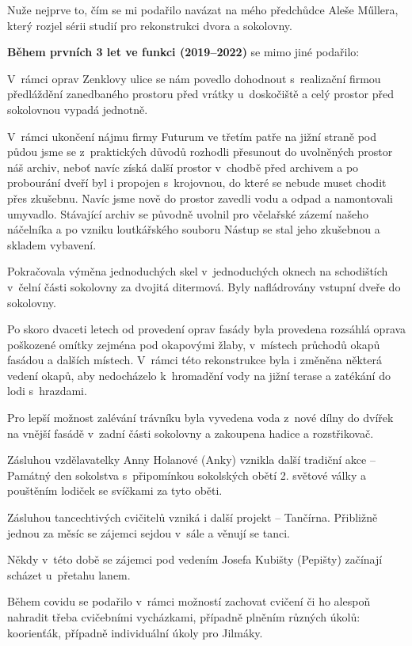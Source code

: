 \documentclass[11pt]{article}
\begin{document}
Nuže nejprve to, čím se mi podařilo navázat na mého předchůdce Aleše Műllera, který rozjel sérii studií pro rekonstrukci dvora a sokolovny. 
 
\textbf{Během prvních 3 let ve funkci (2019–2022)} se mimo jiné podařilo: 

V~rámci oprav Zenklovy ulice se nám povedlo dohodnout s~realizační firmou předláždění zanedbaného prostoru před vrátky u~doskočiště a celý prostor před sokolovnou vypadá jednotně. 

V~rámci ukončení nájmu firmy Futurum ve třetím patře na jižní straně pod půdou jsme se z~praktických důvodů rozhodli přesunout do uvolněných prostor náš archiv, neboť navíc získá další prostor v~chodbě před archivem a po probourání dveří byl i propojen s~krojovnou, do které se nebude muset chodit přes zkušebnu. Navíc jsme nově do prostor zavedli vodu a odpad a namontovali umyvadlo. Stávající archiv se původně uvolnil pro včelařské zázemí našeho náčelníka a po vzniku loutkářského souboru Nástup se stal jeho zkušebnou a skladem vybavení.

Pokračovala výměna jednoduchých skel v~jednoduchých oknech na schodištích v~čelní části sokolovny za dvojitá ditermová. Byly nafládrovány vstupní dveře do sokolovny.

Po skoro dvaceti letech od provedení oprav fasády byla provedena rozsáhlá oprava poškozené omítky zejména pod okapovými žlaby, v~místech průchodů okapů fasádou a dalších místech. V~rámci této rekonstrukce byla i změněna některá vedení okapů, aby nedocházelo k~hromadění vody na jižní terase a zatékání do lodi s~hrazdami.

Pro lepší možnost zalévání trávníku byla vyvedena voda z~nové dílny do dvířek na vnější fasádě v~zadní části sokolovny a zakoupena hadice a rozstřikovač.

Zásluhou vzdělavatelky Anny Holanové (Anky) vznikla další tradiční akce – Památný den sokolstva s~připomínkou sokolských obětí 2. světové války a pouštěním lodiček se svíčkami za tyto oběti.

Zásluhou tancechtivých cvičitelů vzniká i další projekt – Tančírna. Přibližně jednou za měsíc se zájemci sejdou v~sále a věnují se tanci.

Někdy v~této době se zájemci pod vedením Josefa Kubišty (Pepišty) začínají scházet u~přetahu lanem.  

Během covidu se podařilo v~rámci možností zachovat cvičení či ho alespoň nahradit třeba cvičebními vycházkami, případně plněním různých úkolů: koorienťák, případně individuální úkoly pro Jilmáky.
\end{document}
